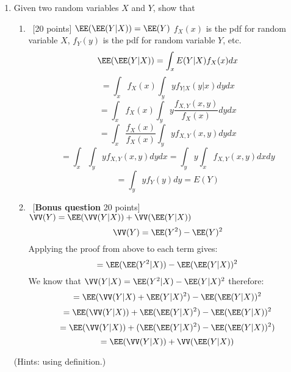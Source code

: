 \documentclass[12pt, fullpage,letterpaper]{article}
\begin{document}
\begin{enumerate}
\item  Given two random variables $X$ and $Y$, show that 
\begin{enumerate}
\item~[20 points] $\EE(\EE(Y|X)) = \EE(Y)$\newline
$f_X(x)$ is the pdf for random variable $X$, $f_Y(y)$ is the pdf for random variable $Y$, etc.
\[\EE(\EE(Y|X)) = \int_xE(Y|X)f_X(x)dx\]
\[= \int_x f_X(x) \int_y yf_{Y|X}(y|x)dydx\]
\[= \int_x f_X(x) \int_y y\frac{f_{X,Y}(x,y)}{f_X(x)}dydx\]
\[= \int_x \frac{f_X(x)}{f_X(x)} \int_y yf_{X,Y}(x,y)dydx\]
\[= \int_x \int_y yf_{X,Y}(x,y)dydx = \int_y y \int_x f_{X,Y}(x,y) dxdy\]
\[= \int_y yf_Y(y) dy = E(Y)\]
\item~[\textbf{Bonus question} 20 points]
$\VV(Y) = \EE(\VV(Y|X)) + \VV(\EE(Y|X))$
\[\VV(Y) = \EE(Y^2) - \EE(Y)^2\]
Applying the proof from above to each term gives:
\[= \EE(\EE(Y^2|X)) - \EE(\EE(Y|X))^2\]
We know that $\VV(Y|X) = \EE(Y^2|X) - \EE(Y|X)^2$ therefore:
\[= \EE(\VV(Y|X) + \EE(Y|X)^2) - \EE(\EE(Y|X))^2\]
\[= \EE(\VV(Y|X)) + \EE(\EE(Y|X)^2) - \EE(\EE(Y|X))^2\]
\[= \EE(\VV(Y|X)) + (\EE(\EE(Y|X)^2) - \EE(\EE(Y|X))^2)\]
\[= \EE(\VV(Y|X)) + \VV(\EE(Y|X))\]
\end{enumerate}
(Hints: using definition.)



\end{enumerate}
\end{document}
